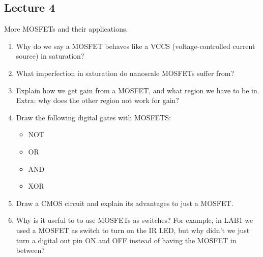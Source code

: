 \subsection*{Lecture 4}
More MOSFETs and their applications.

\begin{enumerate}
  \item Why do we say a MOSFET behaves like a VCCS (voltage-controlled current source)
  in saturation?
  \item What imperfection in saturation do nanoscale MOSFETs suffer from?
  \item Explain how we get gain from a MOSFET, and what region we have to be in.
  Extra: why does the other region not work for gain?
  \item Draw the following digital gates with MOSFETS:
  \begin{itemize}
    \item NOT
    \item OR 
    \item AND 
    \item XOR
  \end{itemize}
  \item Draw a CMOS circuit and explain its advantages to just a MOSFET.

  \item Why is it useful to to use MOSFETs as switches? For example, in LAB1 we used 
  a MOSFET as switch to turn on the IR LED, but why didn't we just turn a digital out pin ON and OFF instead of 
  having the MOSFET in between?
\end{enumerate}
